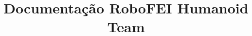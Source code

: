 \documentclass[acronym,symbols]{fei}
\author{}
\title{Documentação RoboFEI Humanoid Team}
\begin{document}
\maketitle

\tableofcontents

\listoffigures
\listoftables
\printglossaries
\listofalgorithms






% 
% 
% 
% 
% 

% 
% 

\printbibliography

\end{document}
